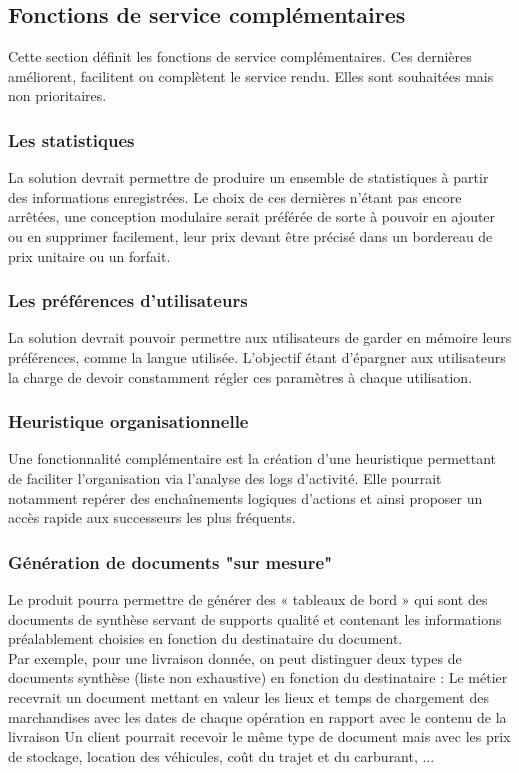 \documentclass[11pt,fleqn]{book} %
\begin{document}
\subsection{Fonctions de service complémentaires}
Cette section définit les fonctions de service complémentaires. Ces dernières améliorent, facilitent ou complètent le service rendu. Elles sont souhaitées mais non prioritaires.

\subsubsection{Les statistiques}
La solution devrait permettre de produire un ensemble de statistiques à partir des informations enregistrées. Le choix de ces dernières n'étant pas encore arrêtées, une conception modulaire serait préférée de sorte à pouvoir en ajouter ou en supprimer facilement, leur prix devant être précisé dans un bordereau de prix unitaire ou un forfait.

\subsubsection{Les préférences d'utilisateurs}
La solution devrait pouvoir permettre aux utilisateurs de garder en mémoire leurs préférences, comme la langue utilisée. L'objectif étant d'épargner aux utilisateurs la charge de devoir constamment régler ces paramètres à chaque utilisation.

\subsubsection{Heuristique organisationnelle}
Une fonctionnalité complémentaire est la création d'une heuristique permettant de faciliter l'organisation via l'analyse des logs d'activité. Elle pourrait notamment repérer des enchaînements logiques d'actions et ainsi proposer un accès rapide aux successeurs les plus fréquents.

\subsubsection{Génération de documents "sur mesure"}
Le produit pourra permettre de générer des « tableaux de bord » qui sont des documents de synthèse servant de supports qualité et contenant les informations préalablement choisies en fonction du destinataire du document.
\\
Par exemple, pour une livraison donnée, on peut distinguer deux types de documents synthèse (liste non exhaustive) en fonction du destinataire :
Le métier recevrait un document mettant en valeur les lieux et temps de chargement des marchandises avec les dates de chaque opération en rapport avec le contenu de la livraison
Un client pourrait recevoir le même type de document mais avec les prix de stockage, location des véhicules, coût du trajet et du carburant, ...
\end{document}
